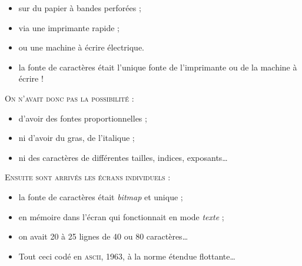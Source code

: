 \documentclass[12pt,a4paper,twocolumn]{book} %
\begin{document}
\begin{itemize}
\item  sur du papier à bandes perforées ;
\item  via une imprimante rapide ;
\item  ou une machine à écrire électrique.
\item  la fonte de caractères était l'unique fonte de l'imprimante ou de la machine à écrire !
\end{itemize}
    {\textsc{On n'avait donc pas la possibilité :}}
    \begin{itemize}
    \item d'avoir des fontes proportionnelles ;
    \item ni d'avoir du gras, de l'italique ;
    \item ni des caractères de différentes tailles, indices, exposants\dots
    \end{itemize}
        {\textsc{Ensuite sont arrivés les écrans individuels :}}
	\begin{itemize}
	\item la fonte de caractères était \textit{bitmap} et unique ;
	\item en mémoire dans l'écran qui fonctionnait en mode \textit{texte} ;
	\item on avait 20 à 25 lignes de 40 ou 80 caractères\dots
	\item Tout ceci codé en \textsc{ascii}, 1963, à la norme étendue flottante\dots
	\end{itemize}
	
\end{document}
